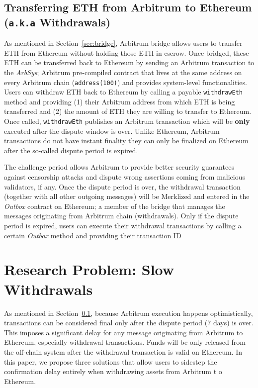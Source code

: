 \subsection{Transferring ETH from Arbitrum to Ethereum (\texttt{a.k.a} Withdrawals)} \label{sec:withdraw}

As mentioned in Section~\ref{sec:bridge}, Arbitrum bridge allows users to transfer ETH from Ethereum without holding those ETH in escrow. Once bridged, these ETH can be transferred back to Ethereum by sending an Arbitrum transaction to the \textit{ArbSys}; Arbitrum pre-compiled contract that lives at the same address on every Arbitrum chain (\texttt{address(100)}) and provides system-level functionalities. Users can withdraw ETH back to Ethereum by calling a payable \texttt{withdrawEth} method and providing (1) their Arbitrum address from which ETH is being transferred and (2) the amount of ETH they are willing to transfer to Ethereum. Once called, \texttt{withdrawEth} publishes an Arbitrum transaction which will be \textbf{only} executed after the dispute window is over. Unlike Ethereum, Arbitrum transactions do not have instant finality \ie they can only be finalized on Ethereum after the so-called dispute period is expired. 

The challenge period allows Arbitrum to provide better security guarantees against censorship attacks and dispute wrong assertions coming from malicious validators, if any. Once the dispute period is over, the withdrawal transaction (together with all other outgoing messages) will be Merklized and entered in the \textit{Outbox} contract on Ethereum; a member of the bridge that manages the messages originating from Arbitrum chain (\eg withdrawals). Only if the dispute period is expired, users can execute their withdrawal transactions by calling a certain \textit{Outbox} method and providing their transaction ID


\section{Research Problem: Slow Withdrawals}
As mentioned in Section~\ref{sec:withdraw}, because Arbitrum execution happens optimistically, transactions can be considered final only after the dispute period (7 days) is over. This imposes a significant delay for any message originating from Arbitrum to Ethereum, especially withdrawal transactions. Funds will be only released from the off-chain system after the withdrawal transaction is valid on Ethereum. In this paper, we propose three solutions that allow users to sidestep the confirmation delay entirely when withdrawing assets from Arbitrum t o Ethereum. 



